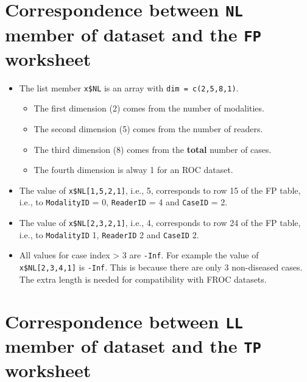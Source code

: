 \documentclass[
]{book}
\providecommand{\tightlist}{%
  \setlength{\itemsep}{0pt}\setlength{\parskip}{0pt}}
\begin{document}
\hypertarget{correspondence-between-nl-member-of-dataset-and-the-fp-worksheet}{%
\section{\texorpdfstring{Correspondence between \texttt{NL} member of dataset and the \texttt{FP} worksheet}{Correspondence between NL member of dataset and the FP worksheet}}\label{correspondence-between-nl-member-of-dataset-and-the-fp-worksheet}}

\begin{itemize}
\tightlist
\item
  The list member \texttt{x\$NL} is an array with \texttt{dim\ =\ c(2,5,8,1)}.

  \begin{itemize}
  \tightlist
  \item
    The first dimension (2) comes from the number of modalities.
  \item
    The second dimension (5) comes from the number of readers.
  \item
    The third dimension (8) comes from the \textbf{total} number of cases.
  \item
    The fourth dimension is alway 1 for an ROC dataset.
  \end{itemize}
\item
  The value of \texttt{x\$NL{[}1,5,2,1{]}}, i.e., 5, corresponds to row 15 of the FP table, i.e., to \texttt{ModalityID} = 0, \texttt{ReaderID} = 4 and \texttt{CaseID} = 2.
\item
  The value of \texttt{x\$NL{[}2,3,2,1{]}}, i.e., 4, corresponds to row 24 of the FP table, i.e., to \texttt{ModalityID} 1, \texttt{ReaderID} 2 and \texttt{CaseID} 2.
\item
  All values for case index \textgreater{} 3 are \texttt{-Inf}. For example the value of \texttt{x\$NL{[}2,3,4,1{]}} is \texttt{-Inf}. This is because there are only 3 non-diseased cases. The extra length is needed for compatibility with FROC datasets.
\end{itemize}

\hypertarget{correspondence-between-ll-member-of-dataset-and-the-tp-worksheet}{%
\section{\texorpdfstring{Correspondence between \texttt{LL} member of dataset and the \texttt{TP} worksheet}{Correspondence between LL member of dataset and the TP worksheet}}\label{correspondence-between-ll-member-of-dataset-and-the-tp-worksheet}}
\end{document}
